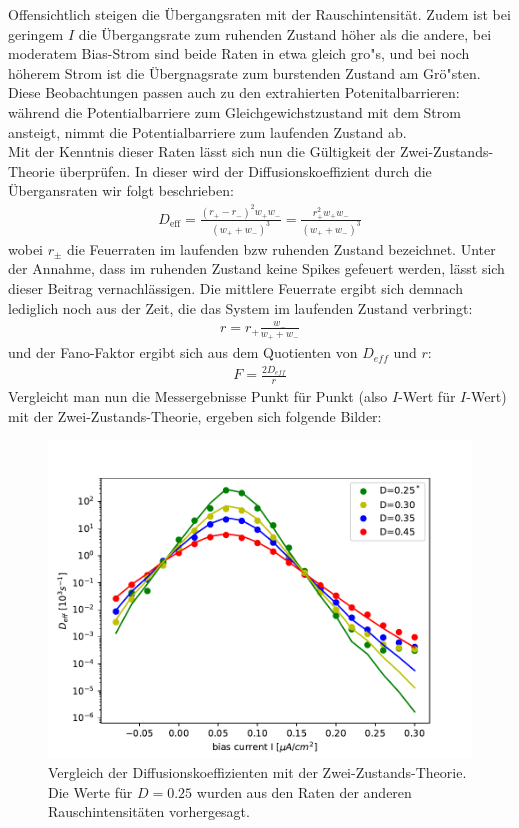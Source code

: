 \documentclass[12pt,a4paper]{article}
\begin{document}
Offensichtlich steigen die Übergangsraten mit der Rauschintensität. Zudem ist bei geringem $I$ die Übergangsrate zum ruhenden Zustand höher als die andere, bei moderatem Bias-Strom sind beide Raten in etwa gleich gro"s, und bei noch höherem Strom ist die Übergnagsrate zum burstenden Zustand am Grö"sten. Diese Beobachtungen passen auch zu den extrahierten Potenitalbarrieren: während die Potentialbarriere zum Gleichgewichstzustand mit dem Strom ansteigt, nimmt die Potentialbarriere zum laufenden Zustand ab. \\
Mit der Kenntnis dieser Raten lässt sich nun die Gültigkeit der Zwei-Zustands-Theorie überprüfen. In dieser wird der Diffusionskoeffizient durch die Übergansraten wir folgt beschrieben:
\begin{align*}
D_{\text{eff}}=\frac{(r_+-r_-)^2 w_+w_-}{(w_++w_-)^3}=\frac{r_+^2 w_+w_-}{(w_++w_-)^3}
\end{align*}
wobei $r_\pm$ die Feuerraten im laufenden bzw ruhenden Zustand bezeichnet. Unter der Annahme, dass im ruhenden Zustand keine Spikes gefeuert werden, lässt sich dieser Beitrag vernachlässigen. Die mittlere Feuerrate ergibt sich demnach lediglich noch aus der Zeit, die das System im laufenden Zustand verbringt:
\begin{align*}
r=r_+\frac{w_-}{w_++w_-}
\end{align*}
und der Fano-Faktor ergibt sich aus dem Quotienten von $D_{eff}$ und $r$:
\begin{align*}
F=\frac{2D_{eff}}{r}
\end{align*}
Vergleicht man nun die Messergebnisse Punkt für Punkt (also $I$-Wert für $I$-Wert) mit der Zwei-Zustands-Theorie, ergeben sich folgende Bilder:
\begin{figure}[H]
	\centering
	\includegraphics[scale=0.5]{deffnofit.pdf}\caption{Vergleich der Diffusionskoeffizienten mit der Zwei-Zustands-Theorie. Die Werte für $D=0.25$ wurden aus den Raten der anderen Rauschintensitäten vorhergesagt.}
	\label{dcomp}
\end{figure}
\end{document}
